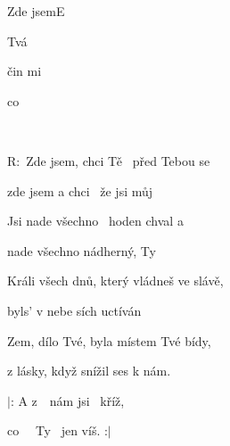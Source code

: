 \pagebreak
\begin{song}{Zde jsem}{E}{}

\begin{SBVerse}

 Tvá  

čin mi 

 co   

  

\end{SBVerse}

\begin{SBChorus}

R: Zde jsem, chci Tě  před Tebou se 

zde jsem a chci  že jsi můj 

Jsi nade všechno  hoden chval a 

nade všechno nádherný, Ty 

\end{SBChorus}

\begin{SBVerse}

Králi všech dnů, který vládneš ve slávě, 

byls' v nebe sích uctíván

Zem, dílo Tvé, byla místem Tvé bídy, 

z lásky, když snížil ses k nám.

\end{SBVerse}

\begin{SBChorus*}

$|$: A z  nám jsi  kříž,

co   Ty  jen víš. :$|$

\end{SBChorus*}

\end{song}